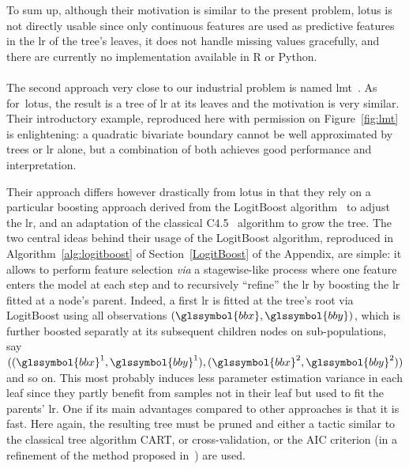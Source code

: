 To sum up, although their motivation is similar to the present problem, \gls{lotus} is not directly usable since only continuous features are used as predictive features in the \gls{lr} of the tree's leaves, it does not handle missing values gracefully, and there are currently no implementation available in \textsf{R} or Python.

\paragraph{}

The second approach very close to our industrial problem is named \gls{lmt}~\cite{landwehr2005logistic}. As for~\gls{lotus}, the result is a tree of \gls{lr} at its leaves and the motivation is very similar. Their introductory example, reproduced here with permission on Figure~\ref{fig:lmt} is enlightening: a quadratic bivariate boundary cannot be well approximated by trees or \gls{lr} alone, but a combination of both achieves good performance and interpretation.

Their approach differs however drastically from \gls{lotus} in that they rely on a particular boosting approach derived from the LogitBoost algorithm~\cite{friedman2000additive} to adjust the \gls{lr}, and an adaptation of the classical C4.5~\cite{quinlan2014c4} algorithm to grow the tree. The two central ideas behind their usage of the LogitBoost algorithm, reproduced in Algorithm~\ref{alg:logitboost} of Section~\ref{LogitBoost} of the Appendix, are simple: it allows to perform feature selection \textit{via} a stagewise-like process where one feature enters the model at each step and to recursively ``refine'' the \gls{lr} by boosting the \gls{lr} fitted at a node's parent. Indeed, a first \gls{lr} is fitted at the tree's root via LogitBoost using all observations $(\glssymbol{bbx},\glssymbol{bby})$, which is further boosted separatly at its subsequent children nodes on sub-populations, say $((\glssymbol{bbx}^1,\glssymbol{bby}^1), (\glssymbol{bbx}^2,\glssymbol{bby}^2))$ and so on. This most probably induces less parameter estimation variance in each leaf since they partly benefit from samples not in their leaf but used to fit the parents' \gls{lr}. One if its main advantages compared to other approaches is that it is fast. Here again, the resulting tree must be pruned and either a tactic similar to the classical tree algorithm CART, or cross-validation, or the AIC criterion (in a refinement of the method proposed in~\cite{sumner2005speeding}) are used.


